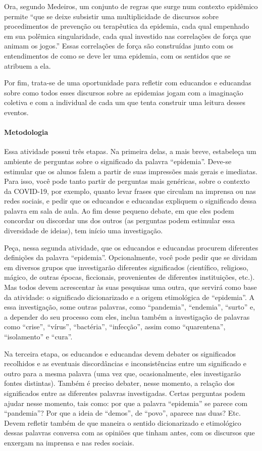 \documentclass[12pt]{extarticle}
\begin{document}
Ora, segundo Medeiros, um conjunto de regras que surge num contexto
epidêmico permite ``que se deixe subsistir uma multiplicidade de
discursos sobre procedimentos de prevenção ou terapêutica da epidemia,
cada qual empenhado em sua polêmica singularidade, cada qual investido
nas correlações de força que animam os jogos.'' Essas correlações de
força são construídas junto com os entendimentos de como se deve ler uma
epidemia, com os sentidos que se atribuem a ela.

Por fim, trata-se de uma oportunidade para refletir com educandos e
educandas sobre como todos esses discursos sobre as epidemias jogam com
a imaginação coletiva e com a individual de cada um que tenta construir
uma leitura desses eventos.

\paragraph{Metodologia}

Essa atividade possui três etapas. Na primeira delas, a mais breve,
estabeleça um ambiente de perguntas sobre o significado da palavra
``epidemia''. Deve-se estimular que os alunos falem a partir de suas
impressões mais gerais e imediatas. Para isso, você pode tanto partir de
perguntas mais genéricas, sobre o contexto da COVID-19, por exemplo,
quanto levar frases que circulam na imprensa ou nas redes sociais, e
pedir que os educandos e educandas expliquem o significado dessa palavra
em sala de aula. Ao fim desse pequeno debate, em que eles podem
concordar ou discordar uns dos outros (as perguntas podem estimular essa
diversidade de ideias), tem início uma investigação.

Peça, nessa segunda atividade, que os educandos e educandas procurem
diferentes definições da palavra ``epidemia''. Opcionalmente, você pode
pedir que se dividam em diversos grupos que investigarão diferentes
significados (científico, religioso, mágico, de outras épocas,
ficcionais, provenientes de diferentes instituições, etc.). Mas todos
devem acrescentar às suas pesquisas uma outra, que servirá como base da
atividade: o significado dicionarizado e a origem etimológica de
``epidemia''. A essa investigação, some outras palavras, como
``pandemia'', ``endemia'', ``surto'' e, a depender do seu processo com
eles, inclua também a investigação de palavras como ``crise'',
``vírus'', ``bactéria'', ``infecção'', assim como ``quarentena'',
``isolamento'' e ``cura''.

Na terceira etapa, os educandos e educandas devem debater os
significados recolhidos e as eventuais discordâncias e inconsistências
entre um significado e outro para a mesma palavra (uma vez que,
ocasionalmente, eles investigarão fontes distintas). Também é preciso
debater, nesse momento, a relação dos significados entre as diferentes
palavras investigadas. Certas perguntas podem ajudar nesse momento, tais
como: por que a palavra ``epidemia'' se parece com ``pandemia''? Por que
a ideia de ``demos'', de ``povo'', aparece nas duas? Etc. Devem refletir
também de que maneira o sentido dicionarizado e etimológico dessas
palavras conversa com as opiniões que tinham antes, com os discursos que
enxergam na imprensa e nas redes sociais.
\end{document}
